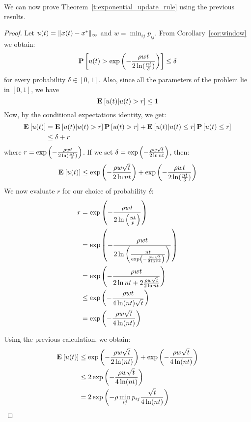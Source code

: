 \noindent We can now prove Theorem~\ref{t:exponential_update_rule} using the previous results.
\begin{proof}
Let $u(t) = \| x(t)-x^* \|_{\infty}$ and $w = \min_{ij}p_{ij}$.
From Corollary~\ref{cor:window} we obtain:
\[ \bm{\mathrm{P}}\left[u(t) >\exp\left(-\frac{\rho wt}{2\ln( \frac{nt}{\delta})} \right)\right] \leq \delta \]
for every probability $\delta \in [0,1]$. Also, since all the
parameters of the problem lie in $[0,1]$, we have
\[\Exp{u(t)|u(t) > r} \leq 1\]
Now, by the conditional expectations identity, we get:
\begin{align*}
\Exp{u(t)} &= \Exp{u(t)|u(t) > r}\Prob{u(t) > r} +\Exp{u(t)|u(t) \leq r}\Prob{u(t) \leq r}\\
&\leq \delta + r
\end{align*}
where $r = \exp \left(-\frac{\rho wt}{2\ln( \frac{nt}{\delta})}\right)$.
If we set $\delta = \exp \left(-\frac{\rho w\sqrt{t}}{2\ln nt}\right)$, then:
\[
\Exp{u(t)} \leq \exp \lp(-\frac{\rho w\sqrt{t}}{2\ln nt}\rp)
+ \exp \lp(-\frac{\rho wt}{2\ln( \frac{nt}{\delta})}\rp)
\]
We now evaluate $r$ for our choice of probability $\delta$:
\begin{align*}
r
&= \exp \left(-\frac{\rho wt}{2\ln\left( \frac{nt}{p}\right)} \right)\\
&= \exp \left(-\frac{\rho wt}{2\ln\left( \frac{nt}{\exp \left(-\frac{\rho w\sqrt{t}}{2\ln nt}\right) }\right) } \right) \\
&= \exp \left(-\frac{\rho wt}{2\ln nt + 2\frac{\rho w\sqrt{t}}{2\ln nt} }\right)\\
&\leq \exp \left(-\frac{\rho w t}{4\ln(nt) \sqrt{t}}\right)\\
&= \exp \left(-\frac{\rho w\sqrt{t}}{4\ln(nt)}\right)
\end{align*}

Using the previous calculation, we obtain:
\begin{align*}
\Exp{u(t)} &\leq \exp \lp(-\frac{\rho w\sqrt{t}}{2\ln (nt)}\rp) +
\exp \lp(-\frac{\rho w\sqrt{t}}{4\ln(nt)}\rp) \\
&\leq 2\exp \lp(-\frac{\rho w\sqrt{t}}{4\ln(nt)}\rp)\\
&=2\exp \lp(- \rho  \min_{ij} p_{ij} \frac{\sqrt{t}}{4\ln(nt)} \rp)
\end{align*}
\end{proof}

